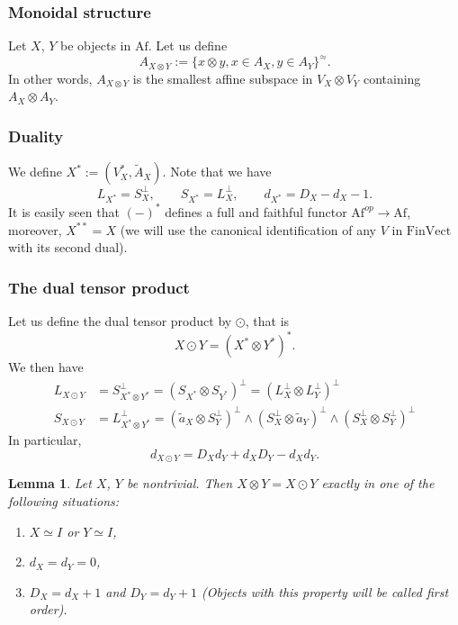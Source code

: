 \documentclass[12pt]{article}
\newtheorem{lemma}{Lemma}
\theoremstyle{definition}
\theoremstyle{remark}
\def \Af{\mathrm{Af}}
\def \FV{\mathrm{FinVect}}
\begin{document}
\subsubsection{Monoidal structure}

Let $X$, $Y$ be objects in $\Af$. Let us define
\[
A_{X\otimes Y}:=\{x\otimes y, x\in A_X, y\in A_Y\}^{\approx}.
\]
In other words, $A_{X\otimes Y}$ is the smallest affine subspace in $V_X\otimes V_Y$ containing
$A_X\otimes A_Y$. 


\subsubsection{Duality}

We define $X^*:=(V_X^*,\tilde A_X)$. Note that we have
\[
L_{X^*}=S_X^\perp,\qquad S_{X^*}=L_X^\perp,\qquad d_{X^*}=D_X-d_X-1.
\]
It is easily seen  that $(-)^*$ defines a full and faithful functor $\Af^{op}\to \Af$,
moreover, $X^{**}=X$ (we will use  the canonical identification of  any $V$ in $\FV$ with its second dual). 



\subsubsection{The dual tensor product}

Let us define the dual tensor product by $\odot$, that is
\[
X\odot Y=(X^*\otimes Y^*)^*.
\]
We then have
\begin{align*}
L_{X\odot Y}&=S^\perp_{X^*\otimes Y^*}=(S_{X^*}\otimes S_{Y^*})^\perp=(L_X^\perp\otimes
L_Y^\perp)^\perp\\
S_{X\odot Y}&= L_{X^*\otimes Y^*}^\perp=(\tilde a_X\otimes
S_Y^\perp)^\perp\wedge(S_X^\perp\otimes \tilde a_Y)^\perp\wedge (S_X^\perp\otimes
S_Y^\perp)^\perp
\end{align*}
In particular,
\[
d_{X\odot Y}=D_Xd_Y+d_XD_Y-d_Xd_Y.
\]
\begin{lemma}\label{lemma:tensors} Let $X$, $Y$ be nontrivial. Then $X\otimes Y=X\odot Y$
exactly in one of the following situations:
\begin{enumerate}
\item $X\simeq I$ or $Y\simeq I$,
\item $d_X=d_Y=0$,
\item $D_X=d_X+1$ and $D_Y=d_Y+1$ (Objects with this property will be called
first order).
\end{enumerate}

\end{lemma}
\end{document}
